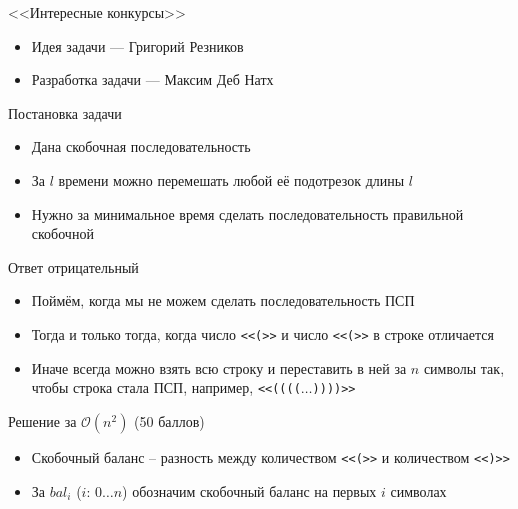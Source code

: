 \begin{frame}
  \begin{center}
    \LARGE <<Интересные конкурсы>>
  \end{center}

  \begin{itemize}
  \item Идея задачи --- Григорий Резников
  \item Разработка задачи --- Максим Деб Натх
  \end{itemize}

\end{frame}

\begin{frame}{Постановка задачи}

  \begin{itemize}
  \item Дана скобочная последовательность
  \item За $l$ времени можно перемешать любой её подотрезок длины $l$
  \item Нужно за минимальное время сделать последовательность правильной скобочной
  \end{itemize}
  
\end{frame}

\begin{frame}{Ответ отрицательный}
  \begin{itemize}
  \item Поймём, когда мы не можем сделать последовательность ПСП
  \item Тогда и только тогда, когда число \texttt{<<(>>} и число \texttt{<<(>>} в строке отличается
  \item Иначе всегда можно взять всю строку и переставить в ней за $n$ символы так, чтобы строка стала ПСП, например, \texttt{<<(((($\dots$))))>>}
  \end{itemize}
\end{frame}

\begin{frame}{Решение за $\mathcal{O}(n^2)$ (50 баллов)}
  \begin{itemize}
  \item Скобочный баланс -- разность между количеством \texttt{<<(>>} и количеством \texttt{<<)>>}
  \item За $bal_i$ ($i:\,0\dots n$) обозначим скобочный баланс на первых $i$ символах
  \end{itemize}
\end{frame}

